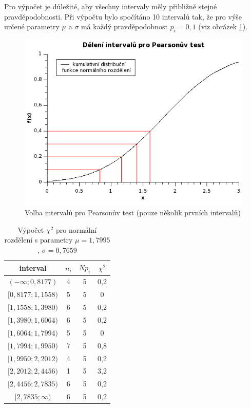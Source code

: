 \documentclass[12pt]{article}
\begin{document}
Pro výpočet je důležité, aby všechny intervaly měly přibližně stejné pravděpodobnosti. Při výpočtu bylo spočítáno 10 intervalů tak, že pro výše určené parametry $\mu$ a $\sigma$ má každý pravděpodobnost $p_i = 0,1$ (viz obrázek \ref{pearso1}).

\begin{figure}[h!]
  \centering
  \includegraphics[width=13cm]{Graph5.png}
  \caption{Volba intervalů pro Pearsonův test (pouze několik prvních intervalů)}
  \label{pearso1} 
\end{figure}

\begin{table}[h!]
 \centering
 \begin{tabular}{|c|c|c|c|}
  \hline
  {\bf interval} & {\bf $n_i$} & {\bf $Np_i$}  & {\bf $\chi^2$}\\
   \hline \hline
	$(-\infty; 0,8177)$ & 4 & 5 & 0,2 \\
	$[0,8177; 1,1558)$ & 5 & 5 & 0 \\
	$[1,1558; 1,3980)$ & 6 & 5 & 0,2 \\
	$[1,3980; 1,6064)$ & 6 & 5 & 0,2 \\
	$[1,6064; 1,7994)$ & 5 & 5 & 0 \\
	$[1,7994; 1,9950)$ & 7 & 5 & 0,8 \\
	$[1,9950; 2,2012)$ & 4 & 5 & 0,2 \\
	$[2,2012; 2,4456)$ & 1 & 5 & 3,2 \\
	$[2,4456; 2,7835)$ & 6 & 5 & 0,2 \\
	$[2,7835; \infty)$ & 6 & 5 & 0,2 \\
	\hline
  \end{tabular}
  \caption{Výpočet $\chi^2$ pro normální rozdělení s parametry  $\mu = 1,7995$, $\sigma = 0,7659$}
  \label{intervaly}
\end{table}
\end{document}
